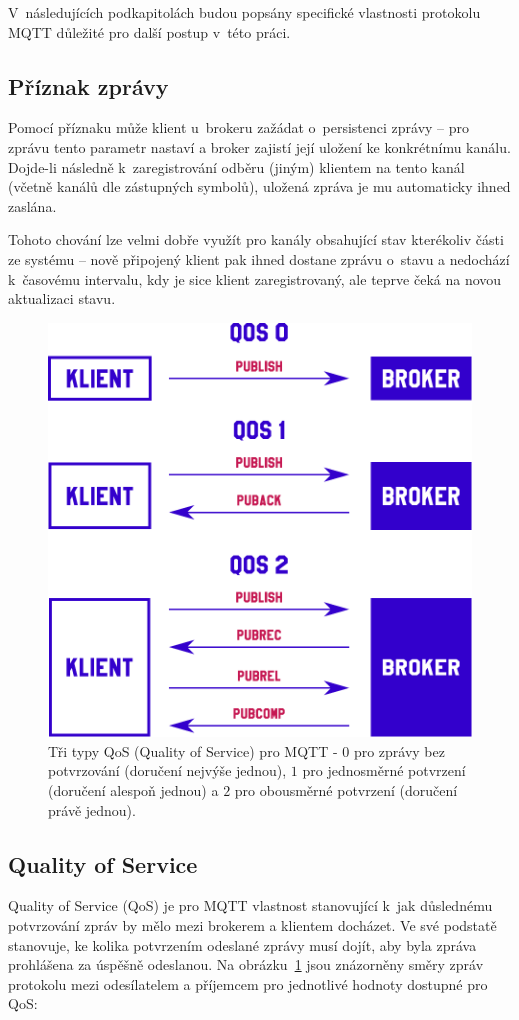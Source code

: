 V~následujících podkapitolách budou popsány specifické vlastnosti protokolu MQTT důležité pro další postup v~této
práci.

\subsection{Příznak zprávy }\label{subsec:priznak-zpravy-retain}
Pomocí příznaku  může klient u~brokeru zažádat o~persistenci zprávy -- pro zprávu tento parametr nastaví a
broker zajistí její uložení ke konkrétnímu kanálu.
Dojde-li následně k~zaregistrování odběru (jiným) klientem na tento kanál (včetně kanálů dle zástupných symbolů),
uložená zpráva je mu automaticky ihned zaslána.

Tohoto chování lze velmi dobře využít pro kanály obsahující stav kterékoliv části ze systému --
nově připojený klient pak ihned dostane zprávu o~stavu a nedochází k~časovému intervalu, kdy je sice klient
zaregistrovaný, ale teprve čeká na novou aktualizaci stavu.

\begin{figure}
    \centering
    \includegraphics[width=.6\textwidth]{figures/qos.pdf}
    \caption{Tři typy QoS (Quality of Service) pro MQTT - $0$ pro zprávy bez potvrzování (doručení nejvýše jednou),
    $1$ pro jednosměrné potvrzení (doručení alespoň jednou) a
    $2$ pro obousměrné potvrzení (doručení právě jednou).}
    \label{fig:mqtt-qos}
\end{figure}

\subsection{Quality of Service}\label{subsec:quality-of-service}
Quality of Service (QoS) je pro MQTT vlastnost stanovující k~jak důslednému potvrzování zpráv by mělo mezi
brokerem a klientem docházet.
Ve své podstatě stanovuje, ke kolika potvrzením odeslané zprávy musí dojít, aby byla
zpráva prohlášena za úspěšně odeslanou.
Na obrázku~\ref{fig:mqtt-qos} jsou znázorněny směry zpráv protokolu mezi odesílatelem a příjemcem pro jednotlivé
hodnoty dostupné pro QoS:

